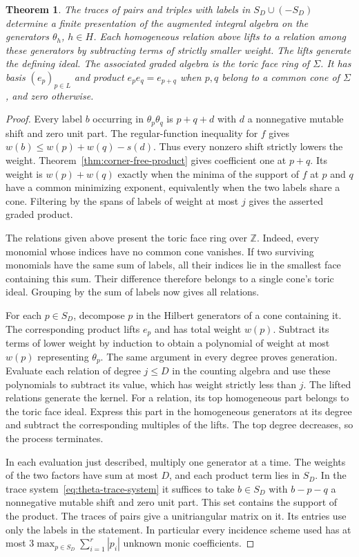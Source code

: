 \documentclass[11pt,reqno]{amsart}
\numberwithin{equation}{section}
\newtheorem{theorem}{Theorem}[section]
\theoremstyle{definition}
\theoremstyle{remark}
\begin{document}
\begin{theorem}\label{thm:finite-forward-presentation}
The traces of pairs and triples with labels in \(S_D\cup(-S_D)\)
determine a finite presentation of the augmented integral algebra
on the generators \(\theta_h\), \(h\in H\). Each homogeneous
relation above lifts to a relation among these generators by subtracting
terms of strictly smaller weight. The lifts generate the defining ideal.
The associated graded algebra is the toric face ring of \(\Sigma\).
It has basis \((e_p)_{p\in L}\) and product \(e_pe_q=e_{p+q}\)
when \(p,q\) belong to a common cone of \(\Sigma\), and zero otherwise.
\end{theorem}
\begin{proof}
Every label \(b\) occurring in \(\theta_p\theta_q\) is \(p+q+d\) with
\(d\) a nonnegative mutable shift and zero unit part. The
regular-function inequality for \(f\) gives \(w(b)\le w(p)+w(q)-s(d)\).
Thus every nonzero shift strictly lowers the weight. Theorem~\ref{thm:corner-free-product} gives coefficient one at \(p+q\). Its weight is
\(w(p)+w(q)\) exactly when the minima of the support of \(f\)
at \(p\) and \(q\) have a common minimizing exponent, equivalently
when the two labels share a cone. Filtering by the spans of labels
of weight at most \(j\) gives the asserted graded product.

The relations given above present the toric face ring over \(\mathbb Z\).
Indeed, every monomial whose indices have no common cone vanishes. If two
surviving monomials have the same sum of labels, all their indices
lie in the smallest face containing this sum. Their difference
therefore belongs to a single cone's toric ideal. Grouping by the
sum of labels now gives all relations.

For each \(p\in S_D\), decompose \(p\) in the Hilbert generators of
a cone containing it. The corresponding product lifts \(e_p\) and
has total weight \(w(p)\). Subtract its terms of lower weight by
induction to obtain a polynomial of weight at most \(w(p)\)
representing \(\theta_p\). The same argument in every degree proves
generation. Evaluate each relation of degree \(j\le D\) in the
counting algebra and use these polynomials to subtract its value,
which has weight strictly less than \(j\). The lifted relations
generate the kernel. For a relation, its top homogeneous part
belongs to the toric face ideal. Express this part in the homogeneous
generators at its degree and subtract the corresponding multiples of
the lifts. The top degree decreases, so the process terminates.

In each evaluation just described, multiply one generator at a time.
The weights of the two factors have sum at most \(D\), and each product term lies
in \(S_D\). In the trace system~\eqref{eq:theta-trace-system} it suffices to take
\(b\in S_D\) with \(b-p-q\) a nonnegative mutable shift and zero
unit part. This set contains the support of the product. The traces of pairs
give a unitriangular matrix on it. Its entries use only the
labels in the statement. In particular every incidence scheme used
has at most \(3\max_{p\in S_D}\sum_{i=1}^r|p_i|\) unknown monic
coefficients.
\end{proof}
\end{document}
